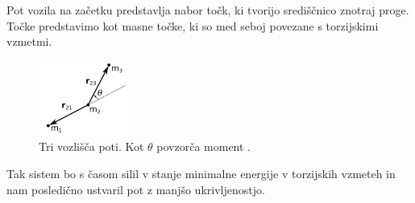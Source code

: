 \documentclass[10pt,a4paper]{article}
\begin{document}
Pot vozila na začetku predstavlja nabor točk, ki tvorijo središčnico znotraj proge. Točke predstavimo kot masne točke, ki so med seboj povezane s torzijskimi vzmetmi.

\begin{figure}[H]
	\centering
	\includegraphics[width=3cm]{pic/slika5.png}
	\caption{Tri vozlišča poti. Kot $\theta$ povzorča moment \cite{VAS}.}
	\label{fig:slika}
\end{figure}

Tak sistem bo s časom silil v stanje minimalne energije v torzijskih vzmeteh in nam posledično ustvaril pot z manjšo ukrivljenostjo.
\end{document}
